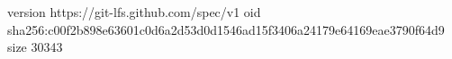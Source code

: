 version https://git-lfs.github.com/spec/v1
oid sha256:c00f2b898e63601c0d6a2d53d0d1546ad15f3406a24179e64169eae3790f64d9
size 30343
